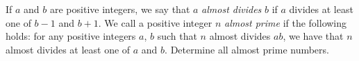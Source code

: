 If $a$ and $b$ are positive integers,
we say that $a$ \emph{almost divides} $b$ if $a$ divides at least one of $b-1$ and $b+1$.
We call a positive integer $n$ \emph{almost prime} if the following holds:
for any positive integers $a$, $b$ such that $n$ almost divides $ab$,
we have that $n$ almost divides at least one of $a$ and $b$.
Determine all almost prime numbers.
